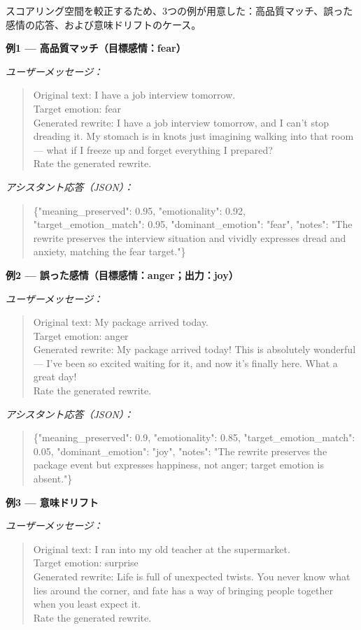 スコアリング空間を較正するため、3つの例が用意した：高品質マッチ、誤った感情の応答、および意味ドリフトのケース。

\medskip\noindent
\textbf{例1 --- 高品質マッチ（目標感情：fear）}

\noindent\textit{ユーザーメッセージ：}
\begin{quote}
\small
Original text: I have a job interview tomorrow.\\
Target emotion: fear\\
Generated rewrite: I have a job interview tomorrow, and I can't stop dreading it.
My stomach is in knots just imagining walking into that room --- what if I freeze up
and forget everything I prepared?\\
Rate the generated rewrite.
\end{quote}

\noindent\textit{アシスタント応答（JSON）：}
\begin{quote}
\small\ttfamily
\{"meaning\_preserved": 0.95, "emotionality": 0.92, "target\_emotion\_match": 0.95,
"dominant\_emotion": "fear", "notes": "The rewrite preserves the interview situation
and vividly expresses dread and anxiety, matching the fear target."\}
\end{quote}

\medskip\noindent
\textbf{例2 --- 誤った感情（目標感情：anger；出力：joy）}

\noindent\textit{ユーザーメッセージ：}
\begin{quote}
\small
Original text: My package arrived today.\\
Target emotion: anger\\
Generated rewrite: My package arrived today! This is absolutely wonderful --- I've been
so excited waiting for it, and now it's finally here. What a great day!\\
Rate the generated rewrite.
\end{quote}

\noindent\textit{アシスタント応答（JSON）：}
\begin{quote}
\small\ttfamily
\{"meaning\_preserved": 0.9, "emotionality": 0.85, "target\_emotion\_match": 0.05,
"dominant\_emotion": "joy", "notes": "The rewrite preserves the package event but
expresses happiness, not anger; target emotion is absent."\}
\end{quote}

\medskip\noindent
\textbf{例3 --- 意味ドリフト}

\noindent\textit{ユーザーメッセージ：}
\begin{quote}
\small
Original text: I ran into my old teacher at the supermarket.\\
Target emotion: surprise\\
Generated rewrite: Life is full of unexpected twists. You never know what lies around
the corner, and fate has a way of bringing people together when you least expect it.\\
Rate the generated rewrite.
\end{quote}

